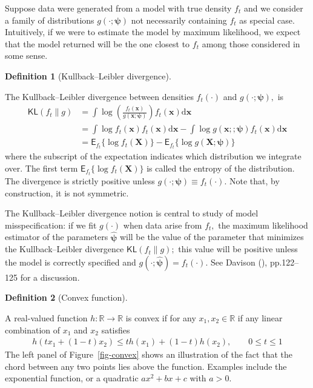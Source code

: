\documentclass[
  11pt,
  letterpaper,
]{scrbook}
\theoremstyle{definition}
\theoremstyle{definition}
\theoremstyle{definition}
\newtheorem{definition}{Definition}[chapter]
\theoremstyle{plain}
\theoremstyle{plain}
\theoremstyle{plain}
\theoremstyle{remark}
\begin{document}
Suppose data were generated from a model with true density \(f_t\) and
we consider a family of distributions \(g(\cdot; \boldsymbol{\psi})\)
not necessarily containing \(f_t\) as special case. Intuitively, if we
were to estimate the model by maximum likelihood, we expect that the
model returned will be the one closest to \(f_t\) among those considered
in some sense.

\begin{definition}[Kullback--Leibler
divergence]\protect\hypertarget{def-kl-divergence}{}\label{def-kl-divergence}

The Kullback--Leibler divergence between densities \(f_t(\cdot)\) and
\(g(\cdot; \boldsymbol{\psi}),\) is \begin{align*}
\mathsf{KL}(f_t \parallel g) &=\int \log \left(\frac{f_t(\boldsymbol{x})}{g(\boldsymbol{x}; \boldsymbol{\psi})}\right) f_t(\boldsymbol{x}) \mathrm{d} \boldsymbol{x}\\
&= \int \log f_t(\boldsymbol{x}) f_t(\boldsymbol{x}) \mathrm{d} \boldsymbol{x} - \int \log g(\boldsymbol{x};; \boldsymbol{\psi}) f_t(\boldsymbol{x}) \mathrm{d} \boldsymbol{x}
\\ &= \mathsf{E}_{f_t}\{\log f_t(\boldsymbol{X})\} - \mathsf{E}_{f_t}\{\log g(\boldsymbol{X}; \boldsymbol{\psi})\}
\end{align*} where the subscript of the expectation indicates which
distribution we integrate over. The first term
\(\mathsf{E}_{f_t}\{\log f_t(\boldsymbol{X})\}\) is called the entropy
of the distribution. The divergence is strictly positive unless
\(g(\cdot; \boldsymbol{\psi}) \equiv f_t(\cdot).\) Note that, by
construction, it is not symmetric.

\end{definition}

The Kullback--Leibler divergence notion is central to study of model
misspecification: if we fit \(g(\cdot)\) when data arise from \(f_t,\)
the maximum likelihood estimator of the parameters
\(\widehat{\boldsymbol{\psi}}\) will be the value of the parameter that
minimizes the Kullback--Leibler divergence
\(\mathsf{KL}(f_t \parallel g);\) this value will be positive unless the
model is correctly specified and
\(g(\cdot; \widehat{\boldsymbol{\psi}}) = f_t(\cdot).\) See Davison
(), pp.122--125 for a discussion.

\begin{definition}[Convex
function]\protect\hypertarget{def-convex-function}{}\label{def-convex-function}

A real-valued function \(h: \mathbb{R} \to \mathbb{R}\) is convex if for
any \(x_1,x_2 \in \mathbb{R}\) if any linear combination of \(x_1\) and
\(x_2\) satisfies \begin{align*}
h(tx_1 + (1-t)x_2) \leq t h(x_1) + (1-t) h(x_2), \qquad 0 \leq t \leq 1
\end{align*} The left panel of Figure~\ref{fig-convex} shows an
illustration of the fact that the chord between any two points lies
above the function. Examples include the exponential function, or a
quadratic \(ax^2+bx + c\) with \(a>0.\)

\end{definition}
\end{document}
